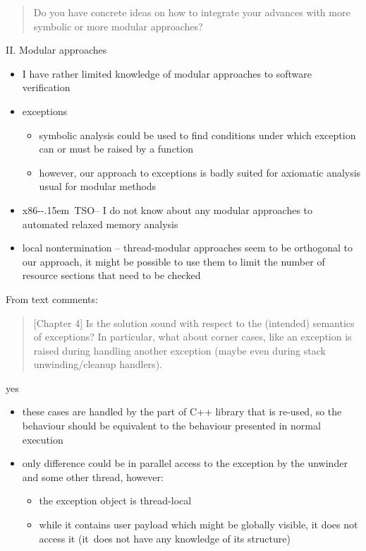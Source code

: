 \documentclass[aspectratio=169, fi]{paradise-slide}
\newcommand{\xtso}{\mbox{x86-\kern-.15em TSO}\xspace}
\newcommand{\rquote}[1]{\begin{quote}#1\end{quote}\bigskip\setlength{\leftmargini}{1em}}
\begin{document}
\begin{frame}[noframenumbering]{\qtitle}
  \rquote{Do you have concrete ideas on how to integrate your advances with more symbolic or more
    modular approaches?}

  \textrm{II.} Modular approaches
  \begin{itemize}
    \item I have rather limited knowledge of modular approaches to software verification
      \pause
    \item exceptions
      \begin{itemize}
        \item symbolic analysis could be used to find conditions under which exception can
          or must be raised by a function
        \item however, our approach to exceptions is badly suited for axiomatic analysis usual for
          modular methods
      \end{itemize}
      \pause
    \item \xtso – I do not know about any modular approaches to automated relaxed memory analysis
      \pause
    \item local nontermination – thread-modular approaches seem to be orthogonal to our approach,
      it might be possible to use them to limit the number of resource sections that need to be
      checked
  \end{itemize}
\end{frame}

\begin{frame}[noframenumbering]{\qtitle}
  From text comments:
  \rquote{[Chapter 4] Is the solution sound with respect to the (intended) semantics of exceptions? In
    particular, what about corner cases, like an exception is raised during handling another
    exception (maybe even during stack unwinding/cleanup handlers).}

  yes
  \begin{itemize}
    \item these cases are handled by the part of C++ library that is re-used, so the behaviour
      should be equivalent to the behaviour presented in normal execution
    \item only difference could be in parallel access to the exception by the unwinder and some other
      thread, however:
      \begin{itemize}
        \item the exception object is thread-local
        \item while it contains user payload which might be globally visible, it does not access it
          (it~does not have any knowledge of its structure)
      \end{itemize}
  \end{itemize}
\end{frame}
\end{document}
